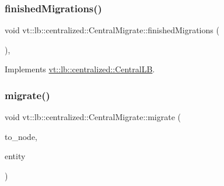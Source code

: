 \subsubsection{\texorpdfstring{finished\+Migrations()}{finishedMigrations()}}
{\footnotesize\ttfamily void vt\+::lb\+::centralized\+::\+Central\+Migrate\+::finished\+Migrations (\begin{DoxyParamCaption}{ }\end{DoxyParamCaption})\hspace{0.3cm}{\ttfamily [override]}, {\ttfamily [virtual]}}



Implements \hyperlink{structvt_1_1lb_1_1centralized_1_1_central_l_b_af989072d4e6277bb8d1dfab6638a335d}{vt\+::lb\+::centralized\+::\+Central\+LB}.

\mbox{\label{structvt_1_1lb_1_1centralized_1_1_central_migrate_ac71e322fccc6b6cceefb3f74e9d8e311}} 
\subsubsection{\texorpdfstring{migrate()}{migrate()}}
{\footnotesize\ttfamily void vt\+::lb\+::centralized\+::\+Central\+Migrate\+::migrate (\begin{DoxyParamCaption}\item[{\hyperlink{namespacevt_a866da9d0efc19c0a1ce79e9e492f47e2}{Node\+Type} const \&}]{to\+\_\+node,  }\item[{\hyperlink{namespacevt_a92ec26fb6644cd0ba7eb0ee70c96bee5}{L\+B\+Entity\+Type} const \&}]{entity }\end{DoxyParamCaption})\hspace{0.3cm}{\ttfamily [protected]}}

\mbox{\label{structvt_1_1lb_1_1centralized_1_1_central_migrate_a0800d9661c46ca7870d6045be68ddcd7}} 
